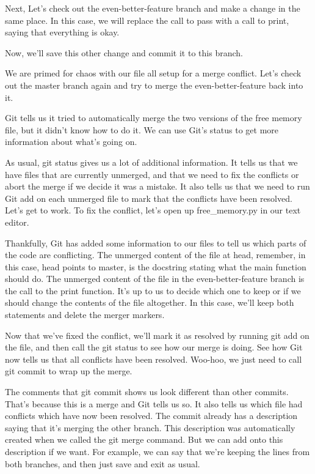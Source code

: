 	Next, Let's check out the even-better-feature branch and make a change in the same place. In this case, we will replace the call to pass with a call to print, saying that everything is okay.
	
	Now, we'll save this other change and commit it to this branch.
	
	We are primed for chaos with our file all setup for a merge conflict. Let's check out the master branch again and try to merge the even-better-feature back into it.
	
	Git tells us it tried to automatically merge the two versions of the free memory file, but it didn't know how to do it. We can use Git's status to get more information about what's going on.
	
	As usual, git status gives us a lot of additional information. It tells us that we have files that are currently unmerged, and that we need to fix the conflicts or abort the merge if we decide it was a mistake. It also tells us that we need to run Git add on each unmerged file to mark that the conflicts have been resolved. Let's get to work. To fix the conflict, let's open up free_memory.py in our text editor.
	
	Thankfully, Git has added some information to our files to tell us which parts of the code are conflicting. The unmerged content of the file at head, remember, in this case, head points to master, is the docstring stating what the main function should do. The unmerged content of the file in the even-better-feature branch is the call to the print function. It's up to us to decide which one to keep or if we should change the contents of the file altogether. In this case, we'll keep both statements and delete the merger markers.
	
	Now that we've fixed the conflict, we'll mark it as resolved by running git add on the file, and then call the git status to see how our merge is doing. See how Git now tells us that all conflicts have been resolved. Woo-hoo, we just need to call git commit to wrap up the merge.
	
	The comments that git commit shows us look different than other commits. That's because this is a merge and Git tells us so. It also tells us which file had conflicts which have now been resolved. The commit already has a description saying that it's merging the other branch. This description was automatically created when we called the git merge command. But we can add onto this description if we want. For example, we can say that we're keeping the lines from both branches, and then just save and exit as usual.
	
